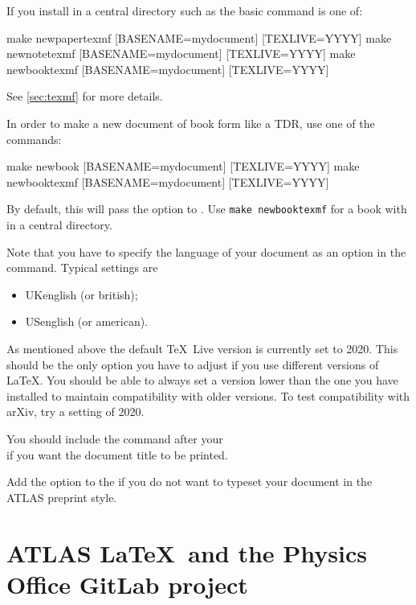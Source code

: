 If you install  in a central directory such as  the basic command is one of:
%
\begin{bashlisting}
make newpapertexmf [BASENAME=mydocument] [TEXLIVE=YYYY]
make newnotetexmf [BASENAME=mydocument] [TEXLIVE=YYYY]
make newbooktexmf [BASENAME=mydocument] [TEXLIVE=YYYY]
\end{bashlisting}
%
See \cref{sec:texmf} for more details.

In order to make a new document of book form like a TDR, use one of the commands:
%
\begin{bashlisting}
make newbook [BASENAME=mydocument] [TEXLIVE=YYYY]
make newbooktexmf [BASENAME=mydocument] [TEXLIVE=YYYY]
\end{bashlisting}
%
By default, this will pass the option  to .
Use \verb|make newbooktexmf| for a book with  in a central directory.

Note that you have to specify the language of your document as an option in the
 command. Typical settings are
\begin{itemize}
\item UKenglish (or british);
\item USenglish (or american).
\end{itemize}

As mentioned above the default \TeX\ Live version is currently set to 2020.
This should be the only option you have to adjust if you use different versions of \LaTeX.
You should be able to always set a version lower than the one you have installed to maintain compatibility with older versions.
To test compatibility with arXiv, try a setting of 2020.

 You should include the command  after your\\
\verb|| if you want the document title to be printed.

Add the option  to the  if you do not want to typeset your document in the ATLAS preprint style.

\section{ATLAS \LaTeX\ and the Physics Office GitLab project}

